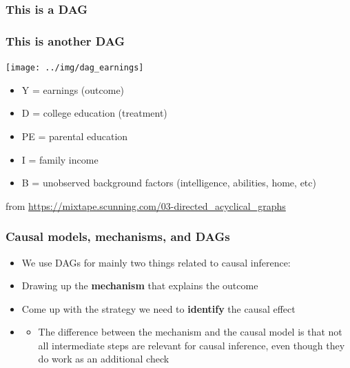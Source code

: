 \documentclass[aspectratio=43]{beamer}
\begin{document}
\begin{frame}
\frametitle{This is a DAG}
\centering


\end{frame}


\begin{frame}
\frametitle{This is another DAG}
\centering

\texttt{[image: ../img/dag\_earnings]}

\vspace{15pt}

\begin{itemize}\footnotesize
  \item Y = earnings (outcome)
  \item D = college education (treatment)
  \item PE = parental education
  \item I = family income
  \item B = unobserved background factors (intelligence, abilities, home, etc)
\end{itemize}



{\tiny from \url{https://mixtape.scunning.com/03-directed_acyclical_graphs}}

\end{frame}

\begin{frame}
\frametitle{Causal models, mechanisms, and DAGs}
\centering

\begin{itemize}
  \item[] We use DAGs for mainly two things related to causal inference:
  \item Drawing up the \textbf{mechanism} that explains the outcome
  \item Come up with the strategy we need to \textbf{identify} the causal effect
  \item[]
  \begin{itemize}
    \item<2-> The difference between the mechanism and the causal model is that not all intermediate steps are relevant for causal inference, even though they do work as an additional check
  \end{itemize}
\end{itemize}

\end{frame}
\end{document}
